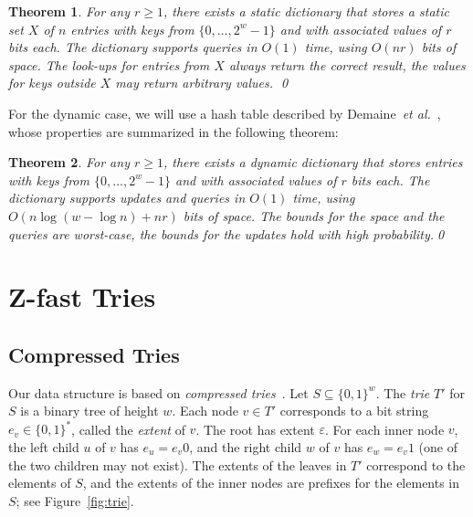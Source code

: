 \documentclass[a4paper,11pt]{article}
\newtheorem{theorem}{Theorem}[section]
\newcommand{\eps}{\varepsilon}
\newcommand{\etal}{\emph{et al.}\xspace}
\newcommand{\?}{\mskip1.5mu}
\begin{document}
\begin{theorem}\label{thm:bloomier_filter}
For any $r \geq 1$, there exists a static dictionary that
stores a static set $X$ of $n$ entries with keys 
from $\{0, \dots, 2^w-1\}$ and with 
associated values of $r$ bits each.
The dictionary supports queries in $O(1)$ time,
using $O(nr)$ \emph{bits} of space. The look-ups for entries
from $X$ always return the correct result, the values
for keys outside $X$ may return arbitrary values.
\qed
\end{theorem}


For the dynamic case, we will use a hash table described
by Demaine~\etal~\cite{DemaineMePaPa06}, whose
properties are summarized in the following theorem:

\begin{theorem}\label{thm:succinct_retrieval_only_hashtable}
For any $r \geq 1$, there exists a dynamic dictionary that
stores entries with keys from $\{0, \dots, 2^w-1\}$ and with 
associated values of $r$ bits each.
The dictionary supports updates and queries in $O(1)$ time,
using $O(n \log(w - \log n) + nr)$ \emph{bits} of space.
The bounds for the space and the queries are
worst-case, the bounds for the updates hold with
high probability.\qed
\end{theorem}

\section{Z-fast Tries} 

\subsection{Compressed Tries}
Our data structure is based on \emph{compressed
tries}~\cite{CormenLeRiSt09,Knuth98}. 
Let $S \subseteq \{0, 1\}^w$. The \emph{trie} $T'$ for $S$ 
is a binary tree of height $w$. Each node $v \in T'$ corresponds
to a bit string $e_v \in \{0,1\}^*$, called the \emph{extent} of $v$. 
The root has extent $\eps$. For each inner node $v$, the left child 
$u$ of $v$  has $e_u = e_v0$, and the right child $w$ of $v$ has 
$e_w = e_v1$ (one of the two children may not exist). The extents of
the leaves in $T'$ correspond to the elements of $S$, and the extents of the 
inner nodes are prefixes for the elements in $S$; see 
Figure~\ref{fig:trie}.
\end{document}
